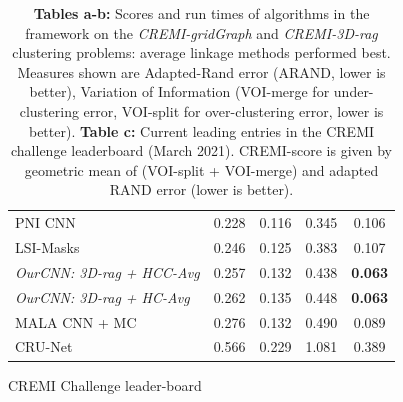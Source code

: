 \begin{table}[t]
\begin{subtable}[t]{.38\textwidth}
\begin{tabular}[t]{lcccc}
PNI CNN \cite{lee2017superhuman} & 0.228 & 0.116 & 0.345 & 0.106 \\
LSI-Masks \cite{bailoni2020proposal}  & 0.246 & 0.125 & 0.383 & 0.107  \\
\emph{OurCNN: 3D-rag + HCC-Avg} & 0.257 & 0.132 & 0.438& \textbf{0.063} \\  
\emph{OurCNN: 3D-rag + HC-Avg} & 0.262 & 0.135 & 0.448 & \textbf{0.063}   \\  
MALA CNN + MC \cite{funke2018large} & 0.276  & 0.132 &0.490  & 0.089  \\
CRU-Net \cite{zeng2017deepem3d} & 0.566 & 0.229 & 1.081 &  0.389    \\
        \end{tabular}
        \caption{CREMI Challenge leader-board}
        \label{tab:cremi_leaderboard}
        \end{subtable}
    \caption{\textbf{Tables a-b:} Scores and run times of algorithms in the \algname{} framework on the \emph{CREMI-gridGraph} and \emph{CREMI-3D-rag} clustering problems: average linkage methods performed best. Measures shown are Adapted-Rand error (ARAND, lower is better), Variation of Information \cite{arganda2015crowdsourcing} (VOI-merge for under-clustering error, VOI-split for over-clustering error, lower is better). \textbf{Table c:} Current leading entries in the CREMI challenge leaderboard (March 2021). CREMI-score is given by geometric mean of (VOI-split + VOI-merge)  and adapted RAND error (lower is better).}
    \label{tab:scores}
\end{table}





